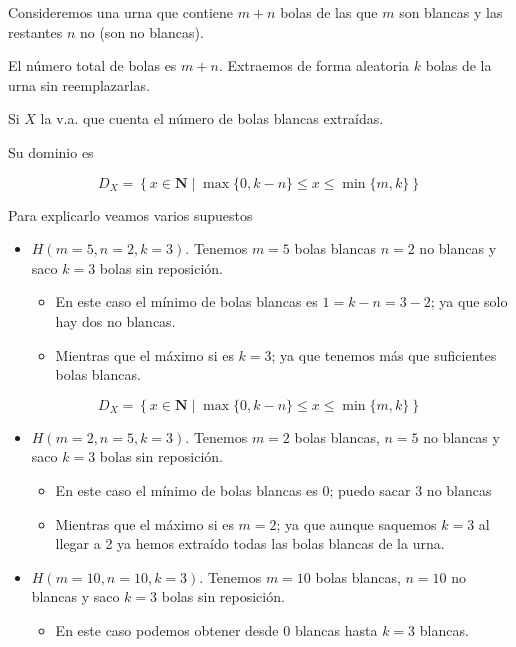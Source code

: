 \documentclass[]{book}
\providecommand{\tightlist}{%
  \setlength{\itemsep}{0pt}\setlength{\parskip}{0pt}}
\begin{document}
Consideremos una urna que contiene \(m+n\) bolas de las que \(m\) son blancas y las restantes \(n\) no (son no blancas).

El número total de bolas es \(m+n\). Extraemos de forma aleatoria \(k\) bolas de la urna sin reemplazarlas.

Si \(X\) la v.a. que cuenta el número de bolas blancas extraídas.

Su dominio es

\[D_X=\left\{x\in\mathbf{N}\mid \max\{0,k-n\}\leq  x \leq \min\{m,k\}\right\}\]

Para explicarlo veamos varios supuestos

\begin{itemize}
\tightlist
\item
  \(H(m=5,n=2,k=3)\). Tenemos \(m=5\) bolas blancas \(n=2\) no blancas y saco \(k=3\) bolas sin reposición.

  \begin{itemize}
  \tightlist
  \item
    En este caso el mínimo de bolas blancas es \(1=k-n=3-2\); ya que solo hay dos no blancas.
  \item
    Mientras que el máximo si es \(k=3\); ya que tenemos más que suficientes bolas blancas.
  \end{itemize}
\end{itemize}

\[D_X=\left\{x\in\mathbf{N}\mid \max\{0,k-n\}\leq  x \leq \min\{m,k\}\right\}\]

\begin{itemize}
\tightlist
\item
  \(H(m=2,n=5,k=3)\). Tenemos \(m=2\) bolas blancas, \(n=5\) no blancas y saco \(k=3\) bolas sin reposición.

  \begin{itemize}
  \tightlist
  \item
    En este caso el mínimo de bolas blancas es \(0\); puedo sacar 3 no blancas
  \item
    Mientras que el máximo si es \(m=2\); ya que aunque saquemos \(k=3\) al llegar a 2 ya hemos extraído todas las bolas blancas de la urna.
  \end{itemize}
\item
  \(H(m=10,n=10,k=3)\). Tenemos \(m=10\) bolas blancas, \(n=10\) no blancas y saco \(k=3\) bolas sin reposición.

  \begin{itemize}
  \tightlist
  \item
    En este caso podemos obtener desde \(0\) blancas hasta \(k=3\) blancas.
  \end{itemize}
\end{itemize}
\end{document}
